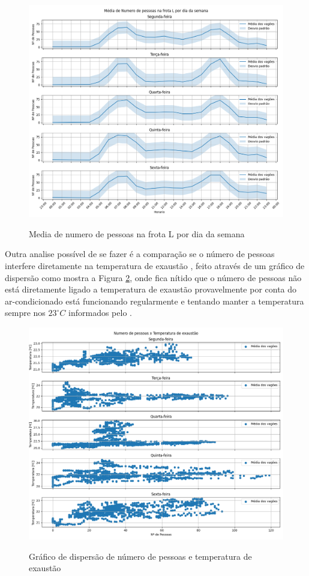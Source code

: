 \documentclass[acronym,symbols,table]{fei}
\begin{document}
\begin{figure}[!htb]
    \centering
    \caption{Media de numero de pessoas na frota L por dia da semana}
    \includegraphics[width=0.8\linewidth]{Imagens/Media_de_Numero_de_pessoas_na_frota_L_por_dia_da_semana.png}
    \label{fig:medianum}
\end{figure}

Outra analise possível de se fazer é a comparação se o número de pessoas interfere diretamente na temperatura de exaustão , feito através de um gráfico de dispersão como mostra a Figura \ref{fig:numerotemperatura}, onde fica nítido que o número de pessoas não está diretamente ligado a temperatura de exaustão provavelmente por conta do ar-condicionado está funcionando regularmente e tentando manter a temperatura sempre nos $23 ^\circ C$ informados pelo \textcite{metrosp2024}.

\begin{figure}[!htb]
    \centering
    \caption{Gráfico de dispersão de número de pessoas e temperatura de exaustão}
    \includegraphics[width=1.0\linewidth]{Imagens/Numero_de_pessoas_x_Temperatura_de_exaustao.png}
    \label{fig:numerotemperatura}
\end{figure}
\end{document}
